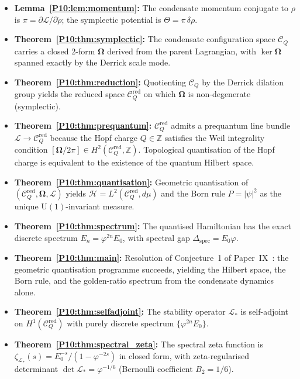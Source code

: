 \documentclass[11pt,a4paper]{article}
\theoremstyle{definition}
\theoremstyle{remark}
\newcommand{\vp}{\varphi}
\newcommand{\ZZ}{\mathbb{Z}}
\newcommand{\Hil}{\mathcal{H}}
\newcommand{\CQ}{\mathcal{C}_Q}
\newcommand{\CQr}{\mathcal{C}_Q^{\mathrm{red}}}
\newcommand{\bOmega}{\boldsymbol{\Omega}}
\newcommand{\dmu}{d\mu}
\begin{document}
\begin{itemize}[itemsep=3pt]

\item \textbf{Lemma~\ref{P10:lem:momentum}:}
  The condensate momentum conjugate to $\rho$ is
  $\pi = \partial\mathcal{L}/\partial\dot\rho$;
  the symplectic potential is $\Theta = \pi\,\delta\rho$.

\item \textbf{Theorem~\ref{P10:thm:symplectic}:}
  The condensate configuration space $\CQ$ carries a closed
  2-form $\bOmega$ derived from the parent Lagrangian,
  with $\ker\bOmega$ spanned exactly by the Derrick scale mode.

\item \textbf{Theorem~\ref{P10:thm:reduction}:}
  Quotienting $\CQ$ by the Derrick dilation group yields the
  reduced space $\CQr$ on which $\bOmega$ is non-degenerate
  (symplectic).

\item \textbf{Theorem~\ref{P10:thm:prequantum}:}
  $\CQr$ admits a prequantum line bundle $\mathcal{L}\to\CQr$
  because the Hopf charge $Q\in\ZZ$ satisfies the Weil
  integrality condition $[\bOmega/2\pi]\in H^2(\CQr,\ZZ)$.
  Topological quantisation of the Hopf charge is equivalent to
  the existence of the quantum Hilbert space.

\item \textbf{Theorem~\ref{P10:thm:quantisation}:}
  Geometric quantisation of $(\CQr,\bOmega,\mathcal{L})$
  yields $\Hil = L^2(\CQr,\dmu)$ and the Born rule
  $P = |\psi|^2$ as the unique $\mathrm{U}(1)$-invariant measure.

\item \textbf{Theorem~\ref{P10:thm:spectrum}:}
  The quantised Hamiltonian has the exact discrete spectrum
  $E_n = \vp^{2n}E_0$, with spectral gap $\Delta_\mathrm{spec}=E_0\vp$.

\item \textbf{Theorem~\ref{P10:thm:main}:}
  Resolution of Conjecture~1 of Paper~IX~\cite{Paper9}:
  the geometric quantisation programme succeeds, yielding
  the Hilbert space, the Born rule, and the golden-ratio spectrum
  from the condensate dynamics alone.

\item \textbf{Theorem~\ref{P10:thm:selfadjoint}:}
  The stability operator $\mathcal{L}_*$ is self-adjoint on
  $H^1(\CQr)$ with purely discrete spectrum $\{\vp^{2n}E_0\}$.

\item \textbf{Theorem~\ref{P10:thm:spectral_zeta}:}
  The spectral zeta function is
  $\zeta_{\mathcal{L}_*}(s) = E_0^{-s}/(1-\vp^{-2s})$
  in closed form, with zeta-regularised determinant
  $\det\mathcal{L}_* = \vp^{-1/6}$ (Bernoulli coefficient $B_2=1/6$).


\end{itemize}
\end{document}
